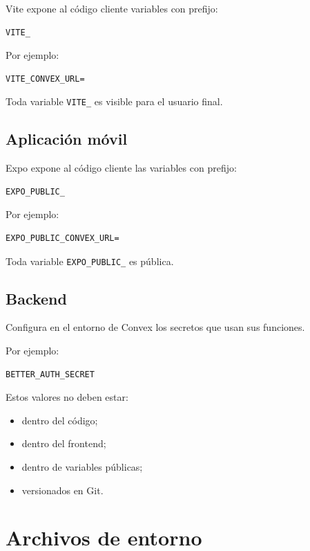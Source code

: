 \documentclass[11pt,a4paper]{article}
\begin{document}
Vite expone al código cliente variables con prefijo:

\begin{lstlisting}
VITE_
\end{lstlisting}

Por ejemplo:

\begin{lstlisting}
VITE_CONVEX_URL=
\end{lstlisting}

Toda variable \texttt{VITE\_} es visible para el usuario final.

\subsection{Aplicación móvil}

Expo expone al código cliente las variables con prefijo:

\begin{lstlisting}
EXPO_PUBLIC_
\end{lstlisting}

Por ejemplo:

\begin{lstlisting}
EXPO_PUBLIC_CONVEX_URL=
\end{lstlisting}

Toda variable \texttt{EXPO\_PUBLIC\_} es pública.

\subsection{Backend}

Configura en el entorno de Convex los secretos que usan sus funciones.

Por ejemplo:

\begin{lstlisting}
BETTER_AUTH_SECRET
\end{lstlisting}

Estos valores no deben estar:

\begin{itemize}
  \item dentro del código;
  \item dentro del frontend;
  \item dentro de variables públicas;
  \item versionados en Git.
\end{itemize}

\section{Archivos de entorno}
\end{document}
